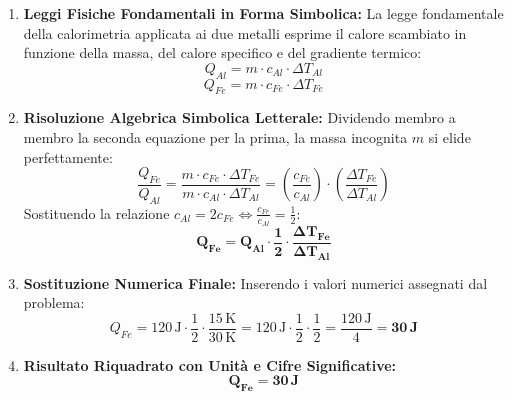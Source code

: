\documentclass[11pt,a4paper,oneside]{report}
\begin{document}
\begin{problema}
\begin{enumerate}[label=\textbf{Fase \arabic*:}, leftmargin=*, itemsep=5pt]
\begin{center}
  \par{}
  \end{center}

  \item \textbf{Leggi Fisiche Fondamentali in Forma Simbolica:}
  La legge fondamentale della calorimetria applicata ai due metalli esprime il calore scambiato in funzione della massa, del calore specifico e del gradiente termico:
  \[
  Q_{Al} = m \cdot c_{Al} \cdot \Delta T_{Al}
  \]
  \[
  Q_{Fe} = m \cdot c_{Fe} \cdot \Delta T_{Fe}
  \]

  \item \textbf{Risoluzione Algebrica Simbolica Letterale:}
  Dividendo membro a membro la seconda equazione per la prima, la massa incognita $m$ si elide perfettamente:
  \[
  \frac{Q_{Fe}}{Q_{Al}} = \frac{m \cdot c_{Fe} \cdot \Delta T_{Fe}}{m \cdot c_{Al} \cdot \Delta T_{Al}} = \left(\frac{c_{Fe}}{c_{Al}}\right) \cdot \left(\frac{\Delta T_{Fe}}{\Delta T_{Al}}\right)
  \]
  Sostituendo la relazione $c_{Al} = 2 c_{Fe} \iff \frac{c_{Fe}}{c_{Al}} = \frac{1}{2}$:
  \[
  \mathbf{Q_{Fe} = Q_{Al} \cdot \frac{1}{2} \cdot \frac{\Delta T_{Fe}}{\Delta T_{Al}}}
  \]

  \item \textbf{Sostituzione Numerica Finale:}
  Inserendo i valori numerici assegnati dal problema:
  \[
  Q_{Fe} = 120\,\text{J} \cdot \frac{1}{2} \cdot \frac{15\,\text{K}}{30\,\text{K}} = 120\,\text{J} \cdot \frac{1}{2} \cdot \frac{1}{2} = \frac{120\,\text{J}}{4} = \mathbf{30\,\text{J}}
  \]

  \item \textbf{Risultato Riquadrato con Unit\`a e Cifre Significative:}
  \[
  \mathbf{\boxed{Q_{Fe} = 30\,\text{J}}}
  \]


\end{enumerate}
\end{problema}
\end{document}
